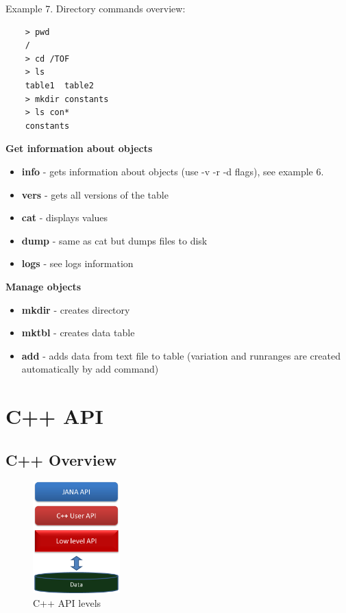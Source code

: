 \documentclass{article}
\begin{document}
Example 7. Directory commands overview:
\begin{verbatim}
    > pwd
    /
	> cd /TOF
	> ls
    table1  table2
	> mkdir constants
	> ls con*
    constants
\end{verbatim}



\textbf{Get information about objects}
\begin{itemize}
  \item \textbf{info} - gets information about objects (use -v -r -d flags), 
  see example 6.
  \item \textbf{vers} - gets all versions of the table
  \item \textbf{cat}  - displays values
  \item \textbf{dump} - same as cat but dumps files to disk
  \item \textbf{logs} - see logs information
\end{itemize}


\textbf{Manage objects}
\begin{itemize}
  \item \textbf{mkdir} - creates directory
  \item \textbf{mktbl} - creates data table
  \item \textbf{add} - adds data from text file to table
        (variation and runranges are created automatically by add command)
\end{itemize}

\newpage
\section{C++ API}\label{sec:cpp}


\subsection{C++ Overview}

\begin{figure}[h]
  \centering
  \includegraphics[width=0.3\textwidth]{pics/cpp_api_levels}
  \caption{C++ API levels}
  \label{pic:cpp_api_levels}
\end{figure}
\end{document}
